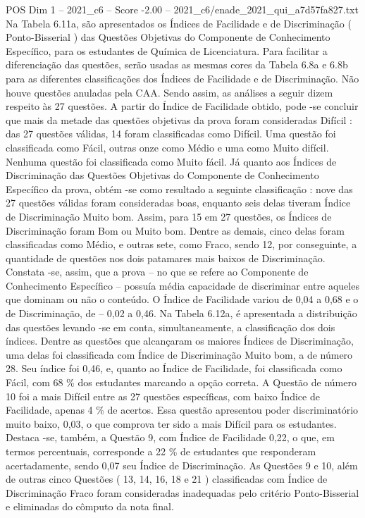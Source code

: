\begin{textsample}{POS Dim 1 – 2021\_c6 – Score -2.00 – 2021\_c6/enade\_2021\_qui\_a7d57fa827.txt}
Na Tabela 6.11a, são apresentados os Índices de Facilidade e de Discriminação ( Ponto-Bisserial ) das Questões Objetivas do Componente de Conhecimento Específico, para os estudantes de Química de Licenciatura.
Para facilitar a diferenciação das questões, serão usadas as mesmas cores da Tabela 6.8a e 6.8b para as diferentes classificações dos Índices de Facilidade e de Discriminação.
Não houve questões anuladas pela CAA.
Sendo assim, as análises a seguir dizem respeito às 27 questões.
A partir do Índice de Facilidade obtido, pode -se concluir que mais da metade das questões objetivas da prova foram consideradas Difícil : das 27 questões válidas, 14 foram classificadas como Difícil.
Uma questão foi classificada como Fácil, outras onze como Médio e uma como Muito difícil.
Nenhuma questão foi classificada como Muito fácil.
Já quanto aos Índices de Discriminação das Questões Objetivas do Componente de Conhecimento Específico da prova, obtém -se como resultado a seguinte classificação : nove das 27 questões válidas foram consideradas boas, enquanto seis delas tiveram Índice de Discriminação Muito bom.
Assim, para 15 em 27 questões, os Índices de Discriminação foram Bom ou Muito bom.
Dentre as demais, cinco delas foram classificadas como Médio, e outras sete, como Fraco, sendo 12, por conseguinte, a quantidade de questões nos dois patamares mais baixos de Discriminação.
Constata -se, assim, que a prova – no que se refere ao Componente de Conhecimento Específico – possuía média capacidade de discriminar entre aqueles que dominam ou não o conteúdo.
O Índice de Facilidade variou de 0,04 a 0,68 e o de Discriminação, de – 0,02 a 0,46.
Na Tabela 6.12a, é apresentada a distribuição das questões levando -se em conta, simultaneamente, a classificação dos dois índices.
Dentre as questões que alcançaram os maiores Índices de Discriminação, uma delas foi classificada com Índice de Discriminação Muito bom, a de número 28.
Seu índice foi 0,46, e, quanto ao Índice de Facilidade, foi classificada como Fácil, com 68 \% dos estudantes marcando a opção correta.
A Questão de número 10 foi a mais Difícil entre as 27 questões específicas, com baixo Índice de Facilidade, apenas 4 \% de acertos.
Essa questão apresentou poder discriminatório muito baixo, 0,03, o que comprova ter sido a mais Difícil para os estudantes.
Destaca -se, também, a Questão 9, com Índice de Facilidade 0,22, o que, em termos percentuais, corresponde a 22 \% de estudantes que responderam acertadamente, sendo 0,07 seu Índice de Discriminação.
As Questões 9 e 10, além de outras cinco Questões ( 13, 14, 16, 18 e 21 ) classificadas com Índice de Discriminação Fraco foram consideradas inadequadas pelo critério Ponto-Bisserial e eliminadas do cômputo da nota final.

\end{textsample}
